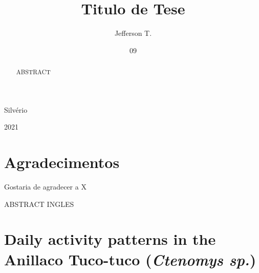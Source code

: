 \documentclass[english,msc,numbers,hidelinks]{coppe}
\begin{document}
  \title{Titulo de Tese}
    \author{Jefferson T.}{Silvério}
  

  \date{09}{2021}
    
  \maketitle

  \frontmatter
  
  \dedication{A alguém cujo valor é digno desta dedicatória.}
    \chapter*{Agradecimentos}
  Gostaria de agradecer a X
  
  \begin{abstract}
  ABSTRACT
  \end{abstract}
  \pagebreak
  \begin{foreignabstract}
  ABSTRACT INGLES
  \end{foreignabstract}
  \tableofcontents
  
    \listoffigures
  
    \listoftables
  
  \printlosymbols
  \printloabbreviations

  \mainmatter
  \hypertarget{daily-activity-patterns-in-the-anillaco-tuco-tuco-ctenomys-sp.}{%
  \chapter{\texorpdfstring{Daily activity patterns in the Anillaco Tuco-tuco (\emph{Ctenomys sp.})}{Daily activity patterns in the Anillaco Tuco-tuco (Ctenomys sp.)}}\label{daily-activity-patterns-in-the-anillaco-tuco-tuco-ctenomys-sp.}}
\end{document}
